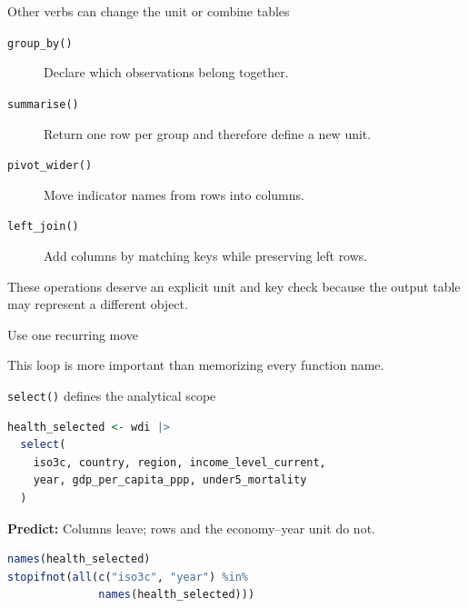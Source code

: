 \begin{frame}{Other verbs can change the unit or combine tables}
  \begin{description}
    \item[\texttt{group\_by()}] Declare which observations belong together.
    \item[\texttt{summarise()}] Return one row per group and therefore define a new unit.
    \item[\texttt{pivot\_wider()}] Move indicator names from rows into columns.
    \item[\texttt{left\_join()}] Add columns by matching keys while preserving left rows.
  \end{description}

  \vfill
  These operations deserve an explicit unit and key check because the output
  table may represent a different object.
\end{frame}

\begin{frame}{Use one recurring move}
  \begin{center}
  \end{center}

  \vfill
  This loop is more important than memorizing every function name.
\end{frame}

\begin{frame}[fragile]{\texttt{select()} defines the analytical scope}
\begin{lstlisting}[language=R]
health_selected <- wdi |>
  select(
    iso3c, country, region, income_level_current,
    year, gdp_per_capita_ppp, under5_mortality
  )
\end{lstlisting}

  \textbf{Predict:} Columns leave; rows and the economy--year unit do not.

\begin{lstlisting}[language=R]
names(health_selected)
stopifnot(all(c("iso3c", "year") %in%
              names(health_selected)))
\end{lstlisting}
\end{frame}

